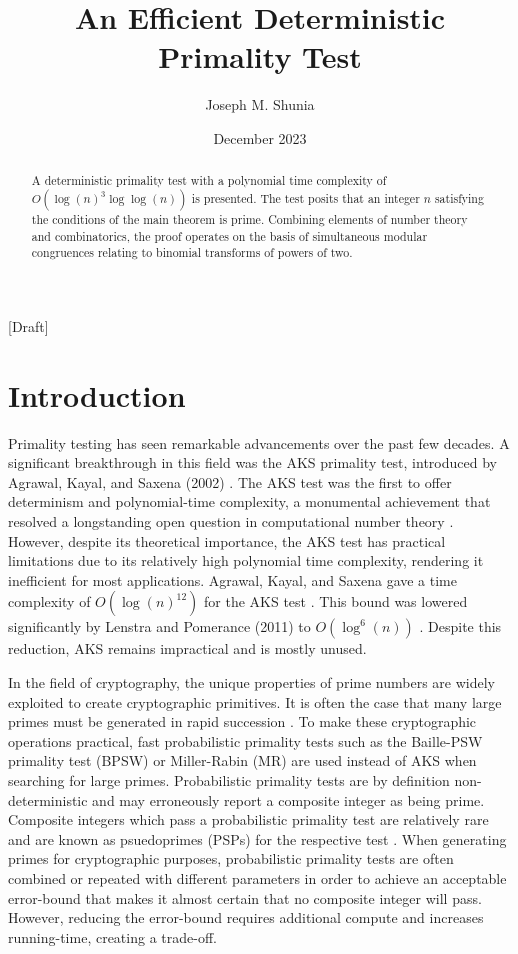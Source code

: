 \documentclass{article}
\title{An Efficient Deterministic Primality Test}
\author{Joseph M. Shunia}
\date{December 2023}
\theoremstyle{plain}
\theoremstyle{definition}
\begin{document}
\maketitle
\begin{center}
    [Draft]
\end{center}

\begin{abstract}
A deterministic primality test with a polynomial time complexity of $O(\log(n)^3 \log\log(n))$ is presented. The test posits that an integer $n$ satisfying the conditions of the main theorem is prime. Combining elements of number theory and combinatorics, the proof operates on the basis of simultaneous modular congruences relating to binomial transforms of powers of two.
\end{abstract}

\section{Introduction}

Primality testing has seen remarkable advancements over the past few decades. A significant breakthrough in this field was the AKS primality test, introduced by Agrawal, Kayal, and Saxena (2002) \cite{aks2002}. The AKS test was the first to offer determinism and polynomial-time complexity, a monumental achievement that resolved a longstanding open question in computational number theory \cite{goldreich2008}. However, despite its theoretical importance, the AKS test has practical limitations due to its relatively high polynomial time complexity, rendering it inefficient for most applications. Agrawal, Kayal, and Saxena gave a time complexity of $O(\log(n)^{12})$ for the AKS test \cite{aks2002}. This bound was lowered significantly by Lenstra and Pomerance (2011) to $O(\log^6(n))$ \cite{lenstra2011}. Despite this reduction, AKS remains impractical and is mostly unused.

In the field of cryptography, the unique properties of prime numbers are widely exploited to create cryptographic primitives. It is often the case that many large primes must be generated in rapid succession \cite{lenstra1987}. To make these cryptographic operations practical, fast probabilistic primality tests such as the Baille-PSW primality test (BPSW) \cite{baillie1980} or Miller-Rabin (MR) \cite{rabin1980} \cite{miller1976} are used instead of AKS when searching for large primes. Probabilistic primality tests are by definition non-deterministic and may erroneously report a composite integer as being prime. Composite integers which pass a probabilistic primality test are relatively rare and are known as psuedoprimes (PSPs) for the respective test \cite{wagstaff1983}. When generating primes for cryptographic purposes, probabilistic primality tests are often combined or repeated with different parameters in order to achieve an acceptable error-bound that makes it almost certain that no composite integer will pass. However, reducing the error-bound requires additional compute and increases running-time, creating a trade-off.
\end{document}
